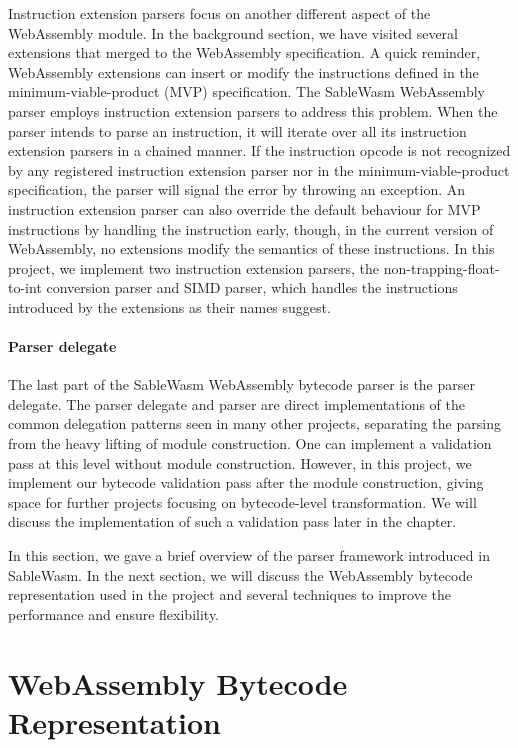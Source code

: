 Instruction extension parsers focus on another different aspect of the
WebAssembly module. In the background section, we have visited several
extensions that merged to the WebAssembly specification. A quick reminder,
WebAssembly extensions can insert or modify the instructions defined in the minimum-viable-product (MVP)  specification. The SableWasm WebAssembly parser
employs instruction extension parsers to address this problem. When the parser
intends to parse an instruction, it will iterate over all its instruction
extension parsers in a chained manner. If the instruction opcode is not
recognized by any registered instruction extension parser nor in the
minimum-viable-product specification, the parser will signal the error by
throwing an exception. An instruction extension parser can also override the
default behaviour for MVP instructions by handling the instruction early,
though, in the current version of WebAssembly, no extensions modify the
semantics of these instructions. In this project, we implement two instruction
extension parsers, the non-trapping-float-to-int conversion parser and SIMD
parser, which handles the instructions introduced by the extensions as their
names suggest.

\paragraph{Parser delegate}
The last part of the SableWasm WebAssembly bytecode parser is the parser
delegate. The parser delegate and parser are direct implementations of the
common delegation patterns seen in many other projects, separating the parsing
from the heavy lifting of module construction. One can implement a validation
pass at this level without module construction. However, in this project, we
implement our bytecode validation pass after the module construction, giving
space for further projects focusing on bytecode-level transformation. We will
discuss the implementation of such a validation pass later in the chapter.

In this section, we gave a brief overview of the parser framework introduced in
SableWasm. In the next section, we will discuss the WebAssembly bytecode
representation used in the project and several techniques to improve the
performance and ensure flexibility.

\section{WebAssembly Bytecode Representation}

